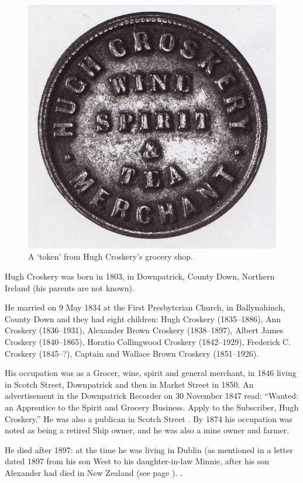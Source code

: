 
\begin{figure}
 \centering
 \includegraphics{photos/Hugh_Croskery_token}
 \caption{A `token' from Hugh Croskery's grocery shop.\cite{DownTown2}}
\end{figure}

Hugh Croskery was born in 1803, in Downpatrick, County Down, Northern Ireland (his parents are not known).

He married  on 9 May 1834 at the First Presbyterian Church, in Ballynahinch, County Down and they had eight children:  Hugh Croskery (1835--1886), Ann Croskery (1836--1931), Alexander Brown Croskery (1838--1897), Albert James Croskery (1840--1865), Horatio Collingwood Croskery (1842--1929), Frederick C. Croskery (1845--?),  Captain  and Wallace Brown Croskery (1851--1926). 

His occupation was as a Grocer, wine, spirit and general merchant, in 1846 living in Scotch Street, Downpatrick and then in Market Street in 1850. An advertisement in the Downpatrick Recorder on 30 November 1847 read:
``Wanted: an Apprentice to the Spirit and Grocery Business. Apply to the Subscriber, Hugh Croskery.''\cite{HCroskeryAdvert}  He was also a publican in Scotch Street \cite{HughCroskeryOccupation}. By 1874 his occupation was noted as being a retired Ship owner, and he was also a mine owner and farmer. 

He died after 1897: at the time he was living in Dublin (as mentioned in a letter dated 1897 from his son West to his daughter-in-law Minnie, after his son Alexander had died in New Zealand (see page \pageref{Samuel_Maxwell_West_Croskery}). \cite{HughCroskeryDeath}.
